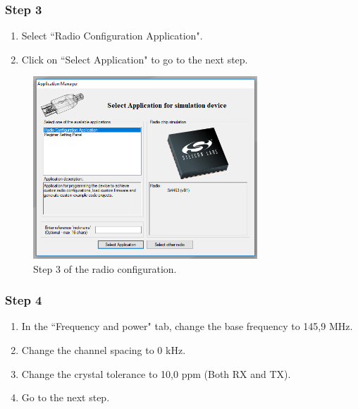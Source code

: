 \subsubsection{Step 3}

\begin{enumerate}
    \item Select ``Radio Configuration Application".
    \item Click on ``Select Application" to go to the next step.
\end{enumerate}

\begin{figure}[!h]
	\begin{center}
		\includegraphics[width=0.75\textwidth]{figures/wds-tutorial-3.png}
		\caption{Step 3 of the radio configuration.}
		\label{fig:wds-tutorial-step-3}
	\end{center}
\end{figure}

\subsubsection{Step 4}

\begin{enumerate}
    \item In the ``Frequency and power" tab, change the base frequency to 145,9 MHz.
    \item Change the channel spacing to 0 kHz.
    \item Change the crystal tolerance to 10,0 ppm (Both RX and TX).
    \item Go to the next step.
\end{enumerate}

